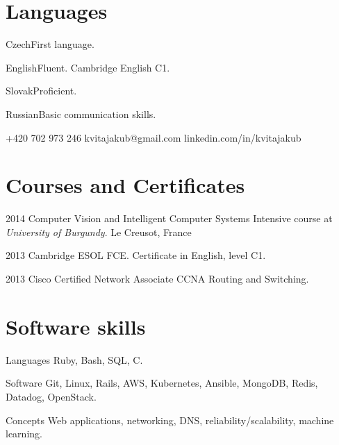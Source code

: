\documentclass{tccv}
\begin{document}
\section{Languages}

\begin{factlist}
	\item{Czech}{First language.}
	\item{English}{Fluent. Cambridge English C1.}
	\item{Slovak}{Proficient.}
	\item{Russian}{Basic communication skills.}
\end{factlist}

{+420 702 973 246}
{kvitajakub@gmail.com}
{linkedin.com/in/kvitajakub}

\section{Courses and Certificates}

\begin{yearlist}
	
	\item{2014}
	{Computer Vision and Intelligent Computer Systems}
	{Intensive course at \emph{University of Burgundy}. Le Creusot, France}
	
	\item{2013}
	{Cambridge ESOL FCE.}
	{Certificate in English, level C1.}
	
	\item{2013}
	{Cisco Certified Network Associate}
	{CCNA Routing and Switching.}
	
	
\end{yearlist}

\section{Software skills}

\begin{factlist}
	
	\item{Languages}
	{Ruby, Bash, SQL, C.}
	
	\item{Software}
	{Git, Linux, Rails, AWS, Kubernetes, Ansible, MongoDB, Redis, Datadog, OpenStack.}
	
	\item{Concepts}
	{Web applications, networking, DNS, reliability/scalability, machine learning.}
	
\end{factlist}
\end{document}
